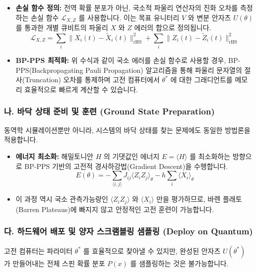 \documentclass[11pt,a4paper]{article}
\begin{document}
\begin{itemize}
    \item \textbf{손실 함수 정의:} 전역 확률 분포가 아닌, 국소적 파울리 연산자의 진화 오차를 측정하는 손실 함수 $\mathcal{L}_{X,Z}$ 를 사용합니다. 이는 목표 유니터리 $V$ 와 변분 안자츠 $U(\theta)$ 를 통과한 개별 큐비트의 파울리 $X$ 와 $Z$ 에러의 합으로 정의됩니다.
    \begin{equation*}
    \mathcal{L}_{X,Z} = \sum_i \|X_i(t) - \tilde{X}_i(t)\|_{\mathrm{rHS}}^2 + \sum_i \|Z_i(t) - \tilde{Z}_i(t)\|_{\mathrm{rHS}}^2
    \end{equation*}
    \item \textbf{BP-PPS 최적화:} 위 수식과 같이 국소 에러를 손실 함수로 사용할 경우, BP-PPS(Backpropagating Pauli Propagation) 알고리즘을 통해 파울리 문자열의 절사(Truncation) 오차를 통제하며 고전 컴퓨터에서 $\theta^*$ 에 대한 그래디언트를 메모리 효율적으로 빠르게 계산할 수 있습니다.
\end{itemize}

\subsubsection*{나. 바닥 상태 준비 및 훈련 (Ground State Preparation)}
동역학 시뮬레이션뿐만 아니라, 시스템의 바닥 상태를 찾는 문제에도 동일한 방법론을 적용합니다.

\begin{itemize}
    \item \textbf{에너지 최소화:} 해밀토니안 $H$ 의 기댓값인 에너지 $E = \langle H \rangle$ 를 최소화하는 방향으로 BP-PPS 기반의 고전적 경사하강법(Gradient Descent)을 수행합니다.
    \begin{equation*}
    E(\theta) = -\sum_{\langle i,j \rangle} J_{ij} \langle Z_i Z_j \rangle_{\theta} - h \sum_i \langle X_i \rangle_{\theta}
    \end{equation*}
    \item 이 과정 역시 국소 관측가능량인 $\langle Z_i Z_j \rangle$ 와 $\langle X_i \rangle$ 만을 평가하므로, 바렌 플래토(Barren Plateaus)에 빠지지 않고 안정적인 고전 훈련이 가능합니다.
\end{itemize}

\subsubsection*{다. 하드웨어 배포 및 양자 스크램블링 샘플링 (Deploy on Quantum)}
고전 컴퓨터는 파라미터 $\theta^*$ 를 효율적으로 찾아낼 수 있지만, 완성된 안자츠 $U(\theta^*)$ 가 만들어내는 전체 스핀 확률 분포 $P(x)$ 를 샘플링하는 것은 불가능합니다.
\end{document}
